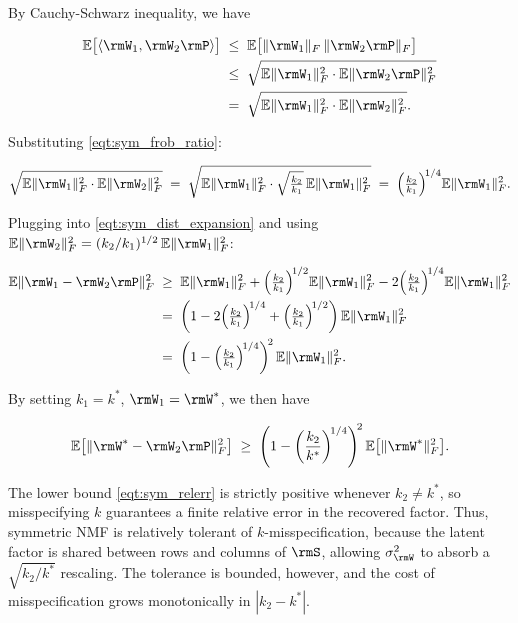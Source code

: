 \documentclass{article}
\begin{document}
By Cauchy-Schwarz inequality, we have

\begin{align}
\mathbb{E}\bigl[\langle \rmW_1, \rmW_2 \rmP \rangle\bigr]
&\;\leq\; \mathbb{E}\bigl[\|\rmW_1\|_F\, \|\rmW_2 \rmP\|_F\bigr] \\
&\;\leq\; \sqrt{\mathbb{E}\|\rmW_1\|_F^2 \cdot \mathbb{E}\|\rmW_2 \rmP\|_F^2} \\
&\;=\; \sqrt{\mathbb{E}\|\rmW_1\|_F^2 \cdot \mathbb{E}\|\rmW_2\|_F^2}.
\end{align}

Substituting \eqref{eqt:sym_frob_ratio}:

\begin{equation*}
\sqrt{\mathbb{E}\|\rmW_1\|_F^2 \cdot \mathbb{E}\|\rmW_2\|_F^2}
\;=\; \sqrt{\mathbb{E}\|\rmW_1\|_F^2 \cdot \sqrt{\tfrac{k_2}{k_1}}\,\mathbb{E}\|\rmW_1\|_F^2}
\;=\; \Bigl(\tfrac{k_2}{k_1}\Bigr)^{\!1/4} \mathbb{E}\|\rmW_1\|_F^2.
\end{equation*}

Plugging into \eqref{eqt:sym_dist_expansion} and using $\mathbb{E}\|\rmW_2\|_F^2 = (k_2/k_1)^{1/2}\,\mathbb{E}\|\rmW_1\|_F^2$:

\begin{align}
\mathbb{E}\|\rmW_1 - \rmW_2 \rmP\|_F^2
&\;\geq\; \mathbb{E}\|\rmW_1\|_F^2 + \Bigl(\tfrac{k_2}{k_1}\Bigr)^{\!1/2} \mathbb{E}\|\rmW_1\|_F^2 - 2\Bigl(\tfrac{k_2}{k_1}\Bigr)^{\!1/4}\mathbb{E}\|\rmW_1\|_F^2 \\
&\;=\; \biggl(1 - 2\Bigl(\tfrac{k_2}{k_1}\Bigr)^{\!1/4} + \Bigl(\tfrac{k_2}{k_1}\Bigr)^{\!1/2}\biggr)\,\mathbb{E}\|\rmW_1\|_F^2 \\
&\;=\; \biggl(1 - \Bigl(\tfrac{k_2}{k_1}\Bigr)^{\!1/4}\biggr)^{\!2}\,\mathbb{E}\|\rmW_1\|_F^2.
\end{align}

By setting $k_1 = k^*$, $\rmW_1 = \rmW^*$, we then have

\begin{equation}
\mathbb{E}\bigl[\|\rmW^* - \rmW_2 \rmP\|_F^2\bigr]
\;\geq\; \Biggl(1 - \biggl(\frac{k_2}{k^*}\biggr)^{\!1/4}\Biggr)^{\!2}
\,\mathbb{E}\bigl[\|\rmW^*\|_F^2\bigr].
\label{eqt:sym_relerr}
\end{equation}

The lower bound \eqref{eqt:sym_relerr} is strictly positive whenever $k_2 \neq k^*$, so misspecifying $k$ guarantees a finite relative error in the recovered factor. Thus, symmetric NMF is relatively tolerant of $k$-misspecification, because the latent factor is shared between rows and columns of $\rmS$, allowing $\sigma_{\rmW}^2$ to absorb a $\sqrt{k_2/k^*}$ rescaling. The tolerance is bounded, however, and the cost of misspecification grows monotonically in $|k_2 - k^*|$.
\end{document}
